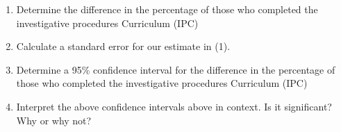 \documentclass[11pt, chapterprefix=true]{scrbook}\usepackage[]{graphicx}\usepackage[]{color}
\begin{document}
\begin{exercises}
\begin{exercise}
\begin{enumerate}
\item Determine the difference in the percentage of those who completed the investigative procedures Curriculum (IPC)

\item Calculate a standard error for our estimate in (1).

\item Determine a 95\% confidence interval for the difference in the percentage of those who completed the investigative procedures Curriculum (IPC)

\item Interpret the above confidence intervals above in context.  Is it significant? Why or why not?


\end{enumerate}

	\end{exercise}
%
%
%

\begin{exercise} %
  

\end{exercise}
\end{exercises}
\end{document}
